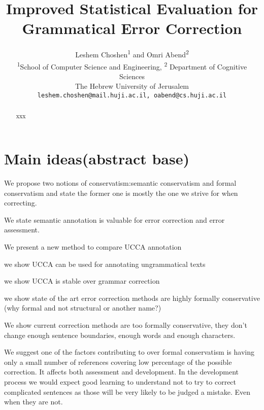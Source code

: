 \documentclass[11pt]{article}
\begin{document}
\title{Improved Statistical Evaluation for Grammatical Error Correction}

\author{
  Leshem Choshen\textsuperscript{1} and Omri Abend\textsuperscript{2} \\
  \textsuperscript{1}School of Computer Science and Engineering, \textsuperscript{2} Department of Cognitive Sciences \\
  The Hebrew University of Jerusalem \\
  \texttt{leshem.choshen@mail.huji.ac.il, oabend@cs.huji.ac.il}\\
}


\maketitle



\begin{abstract}
xxx

\end{abstract}


\section{Main ideas(abstract base)}

We propose two notions of conservatism:semantic conservatism and formal
conservatism and state the former one is mostly the one we strive
for when correcting.

We state semantic annotation is valuable for error correction and
error assessment.

We present a new method to compare UCCA annotation

we show UCCA can be used for annotating ungrammatical texts

we show UCCA is stable over grammar correction

we show state of the art error correction methods are highly formally
conservative (why formal and not structural or another name?)

We show current correction methods are too formally conservative,
they don't change enough sentence boundaries, enough words and enough
characters.

We suggest one of the factors contributing to over formal conservatism
is having only a small number of references covering low percentage
of the possible correction. It affects both assessment and development.
In the development process we would expect good learning to understand
not to try to correct complicated sentences as those will be very
likely to be judged a mistake. Even when they are not.
\end{document}
